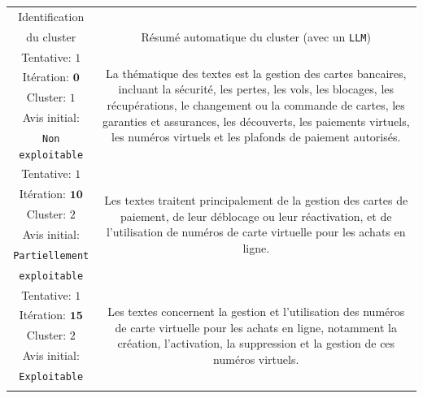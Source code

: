 			\begin{table}[!htb]
				\begin{center}
				\def\arraystretch{0.8}  %
				\begin{tabular}{|c|c|}
				
				\hline
				\rowcolor{colorTableHeader!15}
				Identification
					& 
					\tabularnewline
				\rowcolor{colorTableHeader!15}
				du cluster
					& \multirow{-2}{*}{
						Résumé automatique du cluster (avec un \texttt{LLM})
					}
					\tabularnewline
					\hline

				{ \footnotesize Tentative: $1$ }
					& \multirow{5}{*}{\parbox{12cm}{
						\footnotesize La thématique des textes est la gestion des cartes bancaires, incluant la sécurité, les pertes, les vols, les blocages, les récupérations, le changement ou la commande de cartes, les garanties et assurances, les découverts, les paiements virtuels, les numéros virtuels et les plafonds de paiement autorisés.
					}}
					\tabularnewline
				{ \footnotesize Itération: $\textbf{0}$ }
					&
					\tabularnewline
				{ \footnotesize Cluster: $1$ }
					&
					\tabularnewline
				{ \footnotesize Avis initial: }
					&
					\tabularnewline
				{ \footnotesize \color{colorDarkPastelRed} \texttt{Non exploitable} }
					&
					\tabularnewline
					\hline
					
				{ \footnotesize Tentative: $1$ }
					& \multirow{6}{*}{\parbox{12cm}{
						\footnotesize Les textes traitent principalement de la gestion des cartes de paiement, de leur déblocage ou leur réactivation, et de l'utilisation de numéros de carte virtuelle pour les achats en ligne.
					}}
					\tabularnewline
				{ \footnotesize Itération: $\textbf{10}$ }
					&
					\tabularnewline
				{ \footnotesize Cluster: $2$ }
					&
					\tabularnewline
				{ \footnotesize Avis initial: }
					&
					\tabularnewline
				{ \footnotesize \color{colorCarrotOrange} \texttt{Partiellement} }
					&
					\tabularnewline
				{ \footnotesize \color{colorCarrotOrange} \texttt{exploitable} }
					&
					\tabularnewline
					\hline
					
				{ \footnotesize Tentative: $1$ }
					& \multirow{5}{*}{\parbox{12cm}{
						\footnotesize Les textes concernent la gestion et l'utilisation des numéros de carte virtuelle pour les achats en ligne, notamment la création, l'activation, la suppression et la gestion de ces numéros virtuels.
					}}
					\tabularnewline
				{ \footnotesize Itération: $\textbf{15}$ }
					&
					\tabularnewline
				{ \footnotesize Cluster: $2$ }
					&
					\tabularnewline
				{ \footnotesize Avis initial: }
					&
					\tabularnewline
				{ \footnotesize \color{colorDarkPastelGreen} \texttt{Exploitable} }
					&
					\tabularnewline
					\hdashline
					

\end{tabular}
\end{center}
\end{table}
